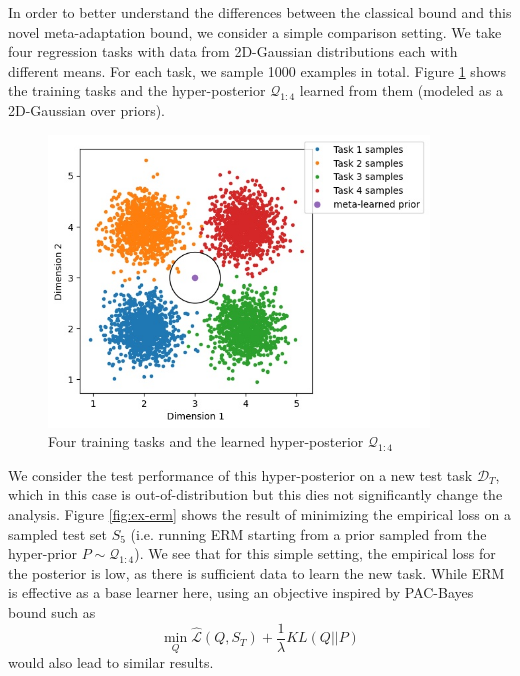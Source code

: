 \documentclass{article}
\theoremstyle{definition}
\begin{document}

In order to better understand the differences between the classical bound and this novel meta-adaptation bound, we consider a simple comparison setting. We take four regression tasks with data from 2D-Gaussian distributions each with different means. 
For each task, we sample 1000 examples in total.
Figure \ref{fig:ex-baseline} shows the training tasks and the hyper-posterior $\mathcal{Q}_{1:4}$ learned from them (modeled as a 2D-Gaussian over priors).

\begin{figure}
	\centering
	\includegraphics[width=0.9\textwidth]{toy_example_train.JPG}
	\caption{Four training tasks and the learned hyper-posterior $\mathcal{Q}_{1:4}$}
	\label{fig:ex-baseline}
\end{figure}

We consider the test performance of this hyper-posterior on a new test task $\mathcal{D}_T$, 
which in this case is out-of-distribution but this dies not significantly change the analysis. Figure \ref{fig:ex-erm} shows the result of minimizing the empirical loss on a sampled test set $S_5$ (i.e. running ERM starting from a prior sampled from the hyper-prior $P\sim \mathcal{Q}_{1:4}$). We see that for this simple setting, the empirical loss for the posterior is low, as there is sufficient data to learn the new task.
While ERM is effective as a base learner here, using an objective inspired by PAC-Bayes bound such as $$\min_{Q}\hat{\mathcal{L}}(Q, S_T) + \frac{1}{\lambda}KL(Q||P)$$ would also lead to similar results. 
\end{document}
